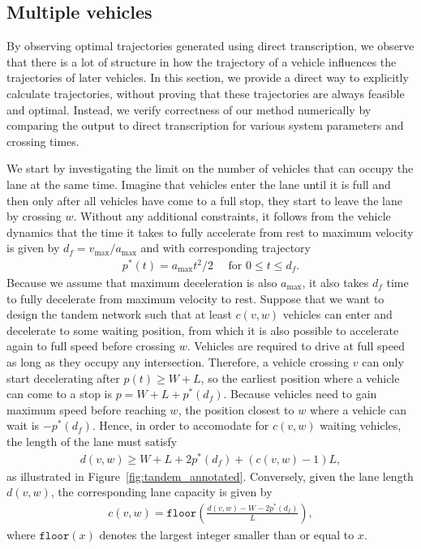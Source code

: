 \documentclass[a4paper]{article}
\theoremstyle{definition}
\theoremstyle{plain}
\begin{document}
\subsection{Multiple vehicles}

By observing optimal trajectories generated using direct transcription, we
observe that there is a lot of structure in how the trajectory of a vehicle
influences the trajectories of later vehicles. In this section, we provide a
direct way to explicitly calculate trajectories, without proving that these
trajectories are always feasible and optimal. Instead, we verify correctness of
our method numerically by comparing the output to direct transcription for
various system parameters and crossing times.

We start by investigating the limit on the number of vehicles that can occupy
the lane at the same time. Imagine that vehicles enter the lane until it is full
and then only after all vehicles have come to a full stop, they start to leave
the lane by crossing $w$.
%
Without any additional constraints, it follows from the vehicle dynamics that
the time it takes to fully accelerate from rest to maximum velocity is given by
$d_{f} = v_{\max} / a_{\max}$ and with corresponding trajectory
\begin{align*}
  p^{*}(t) = a_{\max} t^{2} / 2 \quad \text{ for } 0 \leq t \leq d_{f} .
\end{align*}
Because we assume that maximum
deceleration is also $a_{\max}$, it also takes $d_{f}$ time to fully decelerate
from maximum velocity to rest.
%
Suppose that we want to design the tandem network such that at least $c(v,w)$
vehicles can enter and decelerate to some waiting position, from which it is
also possible to accelerate again to full speed before crossing $w$.
%
Vehicles are required to drive at full speed as long as they occupy
any intersection. Therefore, a vehicle crossing $v$ can only start decelerating
after $p(t) \geq W + L$, so the earliest position where a vehicle can come to a
stop is $p = W + L + p^{*}(d_{f})$.
%
Because vehicles need to gain maximum speed before reaching $w$,
the position closest to $w$ where a vehicle can wait is $- p^{*}(d_{f})$.
%
Hence, in order to accomodate for $c(v,w)$ waiting vehicles, the length of the
lane must satisfy
\begin{align*}
  d(v, w) \geq W + L + 2p^{*}(d_{f}) + (c(v,w) - 1) L ,
\end{align*}
as illustrated in Figure~\ref{fig:tandem_annotated}.
%
Conversely, given the lane length $d(v,w)$, the corresponding lane capacity is
given by
\begin{align*}
  c(v, w) = \texttt{floor}\left( \frac{d(v,w) - W - 2 p^{*}(d_{f})}{L} \right) ,
\end{align*}
where $\texttt{floor}(x)$ denotes the largest integer smaller than or equal to
$x$.
\end{document}
